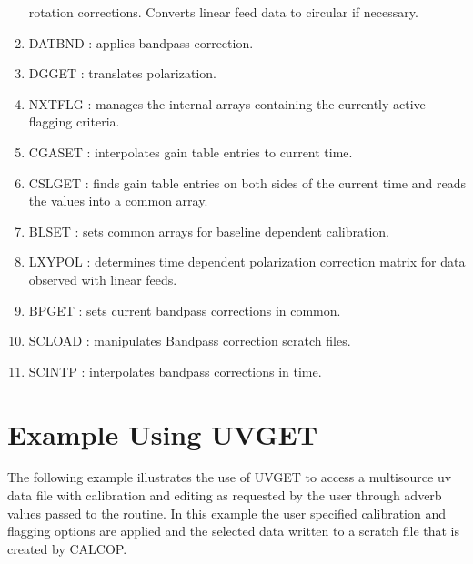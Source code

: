 \begin{enumerate}
rotation corrections.  Converts linear feed data to circular if
necessary.
\item DATBND : applies bandpass correction.
\item DGGET : translates polarization.
\item NXTFLG : manages the internal arrays containing
the currently active flagging criteria.
\item CGASET : interpolates gain table entries to current time.
\item CSLGET : finds gain table entries on both sides of
the current time and reads the values into a common array.
\item BLSET : sets common arrays for baseline dependent
calibration.
\item LXYPOL : determines time dependent polarization
correction matrix for data observed with linear feeds.
\item BPGET : sets current bandpass corrections in
common.
\item SCLOAD : manipulates Bandpass correction scratch
files.
\item SCINTP : interpolates bandpass corrections in
time.

\end{enumerate} %

\section{Example Using UVGET}

    The following example illustrates the use of UVGET to access
a multisource uv data file with calibration and editing as requested
by the user through adverb values passed to the routine.  In this
example the user specified calibration and flagging options are
applied and the selected data written to a scratch file that is
created by CALCOP.

